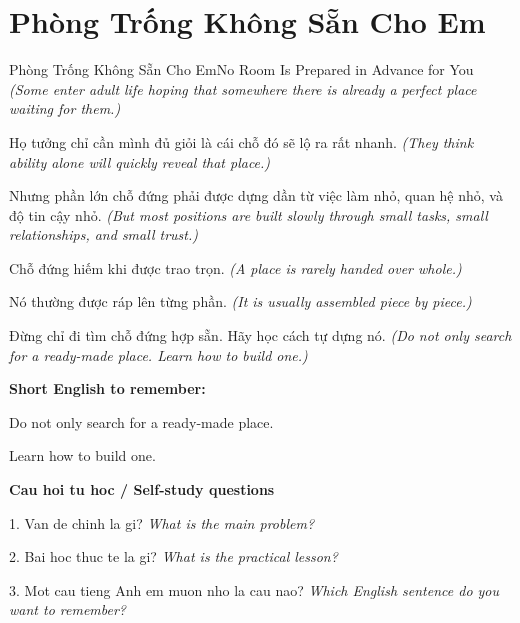 \section{Phòng Trống Không Sẵn Cho Em}
\begin{truyen}{Phòng Trống Không Sẵn Cho Em}{No Room Is Prepared in Advance for You}
\textit{(Some enter adult life hoping that somewhere there is already a perfect place waiting for them.)}

Họ tưởng chỉ cần mình đủ giỏi là cái chỗ đó sẽ lộ ra rất nhanh.
\textit{(They think ability alone will quickly reveal that place.)}

Nhưng phần lớn chỗ đứng phải được dựng dần từ việc làm nhỏ, quan hệ nhỏ, và độ tin cậy nhỏ.
\textit{(But most positions are built slowly through small tasks, small relationships, and small trust.)}

Chỗ đứng hiếm khi được trao trọn.
\textit{(A place is rarely handed over whole.)}

Nó thường được ráp lên từng phần.
\textit{(It is usually assembled piece by piece.)}

\end{truyen}

\begin{baihoc}
Đừng chỉ đi tìm chỗ đứng hợp sẵn. Hãy học cách tự dựng nó.
\textit{(Do not only search for a ready-made place. Learn how to build one.)}
\end{baihoc}

\begin{ghinhoanh}
\textbf{Short English to remember:}

Do not only search for a ready-made place.

Learn how to build one.

\end{ghinhoanh}

\begin{tuhocnhanh}
\textbf{Cau hoi tu hoc / Self-study questions}

1. Van de chinh la gi? \textit{What is the main problem?}

2. Bai hoc thuc te la gi? \textit{What is the practical lesson?}

3. Mot cau tieng Anh em muon nho la cau nao? \textit{Which English sentence do you want to remember?}
\end{tuhocnhanh}
\ngancach

